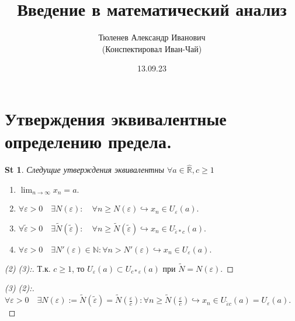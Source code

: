 \documentclass[a5paper, 10pt]{article}
\theoremstyle{plain}
\newtheorem*{statement}{St}
\newcommand{\N}{\mathbb N}
\newcommand{\eps}{\varepsilon}
\newcommand{\Rh}{\hat{\mathbb R}}
\newcommand{\hrarrow}{\hookrightarrow}
\newcommand{\Rarrow}{\Rightarrow}
\begin{document}
	\author{Тюленев Александр Иванович\\(Конспектировал Иван-Чай)}
	\date{13.09.23}
	\title{Введение в математический анализ}

	\linespread{1.4}
	\selectfont

	\maketitle
	\newpage

	\tableofcontents

    \section{Утверждения эквивалентные определению предела.}

    \begin{statement}
        Следущие утверждения эквивалентны $ \forall a \in \Rh, c \geq 1 $

        \begin{enumerate}
            \item $ \lim_{n \to \infty} x_n = a. $
            \item $ \forall \eps > 0 \quad \exists N(\eps): \quad \forall n \geq N(\eps)
                \hrarrow x_n \in U_\eps(a). $
            \item $ \forall \widetilde{\eps} > 0 \quad \exists \widetilde{N} (\widetilde{\eps}):
                \quad \forall n \geq \widetilde{N} (\widetilde{\eps})
                \hrarrow x_n \in U_{\widetilde{\eps} * c}(a). $
            \item $ \forall \eps > 0 \quad \exists N'(\eps) \in \N:
                \forall n > N'(\eps) \hrarrow x_n \in U_{\eps}(a). $
        \end{enumerate}
    \end{statement}

    \begin{proof}[(2) \Rarrow (3):]
        Т.к. $ c \geq 1 $, то $ U_{\eps}(a) \subset U_{c*\eps}(a) $
        \Rarrow при $ \widetilde{N} = N(\eps). $
    \end{proof}

    \begin{proof}[(3) \Rarrow (2):]
        $ \forall \eps > 0 \quad
        \exists N(\eps) := \widetilde{N} (\widetilde{\eps}) =
        \widetilde{N}\left(\frac{\eps}{c}\right):
        \forall n \geq \widetilde{N} \left( \frac{\eps}{c} \right) \hrarrow
        x_n \in U_{\widetilde{\eps} c}(a) = U_{\eps}(a). $
    \end{proof}
\end{document}
